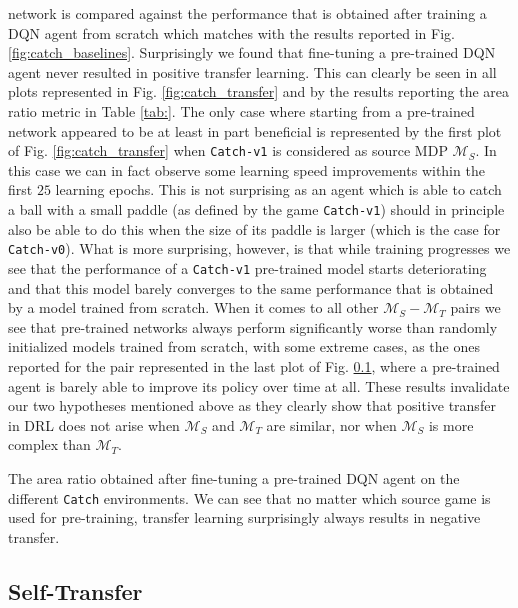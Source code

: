 network is compared against the performance that is obtained after training a DQN agent from scratch which matches with the results reported in Fig. \ref{fig:catch_baselines}.
Surprisingly we found that fine-tuning a pre-trained DQN agent never resulted in positive transfer learning. This can clearly be seen in all plots represented in Fig. \ref{fig:catch_transfer} and by the results reporting the area ratio metric in Table \ref{tab:}. The only case where starting from a pre-trained network appeared to be at least in part beneficial is represented by the first plot of Fig. \ref{fig:catch_transfer} when \texttt{Catch-v1} is considered as source MDP $\mathcal{M}_S$. In this case we can in fact observe some learning speed improvements within the first $25$ learning epochs. This is not surprising as an agent which is able to catch a ball with a small paddle (as defined by the game \texttt{Catch-v1}) should in principle also be able to do this when the size of its paddle is larger (which is the case for \texttt{Catch-v0}). What is more surprising, however, is that while training progresses we see that the performance of a \texttt{Catch-v1} pre-trained model starts deteriorating and that this model barely converges to the same performance that is obtained by a model trained from scratch. When it comes to all other $\mathcal{M}_S-\mathcal{M}_T$ pairs we see that pre-trained networks always perform significantly worse than randomly initialized models trained from scratch, with some extreme cases, as the ones reported for the pair represented in the last plot of Fig. \ref{}, where a pre-trained agent is barely able to improve its policy over time at all. These results invalidate our two hypotheses mentioned above as they clearly show that positive transfer in DRL does not arise when $\mathcal{M}_S$ and $\mathcal{M}_T$ are similar, nor when $\mathcal{M}_S$ is more complex than $\mathcal{M}_T$. 



\begin{table}
	\centering
	\caption{The area ratio obtained after fine-tuning a pre-trained DQN agent on the different \texttt{Catch} environments. We can see that no matter which source game is used for pre-training, transfer learning surprisingly always results in negative transfer.}
	
\end{table}


\subsection{Self-Transfer}

